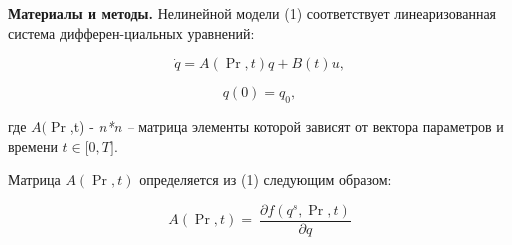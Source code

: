 {\bfseries Материалы и методы.} Нелинейной модели (1) соответствует
линеаризованная система дифферен-циальных уравнений:


\begin{equation}
\dot{q} = A\left( \Pr,t \right)q + B(t)u,
\end{equation} 

\begin{equation}
q(0) = q_{0},
\end{equation}

где \(A(\Pr\),t) - \emph{n*n --} матрица элементы которой зависят от
вектора параметров и времени \(t \in \lbrack 0,T\rbrack\).

Матрица \(A\left( \Pr,t \right)\) определяется из (1) следующим образом:

\begin{equation}
A\left( \Pr,t \right) = \ \frac{\partial f\left( q^{s},\Pr,t \right)}{\partial q}
\end{equation} 
